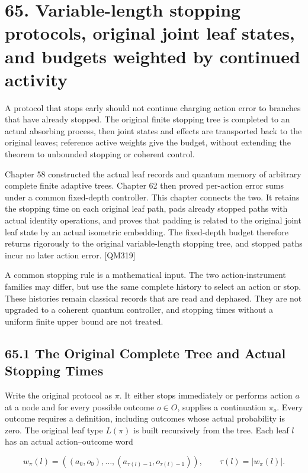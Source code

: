 \documentclass[
  11pt,
  oneside]{book}
\begin{document}
\chapter{65. Variable-length stopping protocols, original joint leaf
states, and budgets weighted by continued activity}\label{ch-65}

A protocol that stops early should not continue charging action error to
branches that have already stopped. The original finite stopping tree is
completed to an actual absorbing process, then joint states and effects
are transported back to the original leaves; reference active weights
give the budget, without extending the theorem to unbounded stopping or
coherent control.

Chapter 58 constructed the actual leaf records and quantum memory of
arbitrary complete finite adaptive trees. Chapter 62 then proved
per-action error sums under a common fixed-depth controller. This
chapter connects the two. It retains the stopping time on each original
leaf path, pads already stopped paths with actual identity operations,
and proves that padding is related to the original joint leaf state by
an actual isometric embedding. The fixed-depth budget therefore returns
rigorously to the original variable-length stopping tree, and stopped
paths incur no later action error. {[}QM319{]}

A common stopping rule is a mathematical input. The two
action-instrument families may differ, but use the same complete history
to select an action or stop. These histories remain classical records
that are read and dephased. They are not upgraded to a coherent quantum
controller, and stopping times without a uniform finite upper bound are
not treated.

\section{65.1 The Original Complete Tree and Actual Stopping Times}

Write the original protocol as \(\pi\). It either stops immediately or
performs action \(a\) at a node and for every possible outcome
\(o\in O\), supplies a continuation \(\pi_o\). Every outcome requires a
definition, including outcomes whose actual probability is zero. The
original leaf type \(L(\pi)\) is built recursively from the tree. Each
leaf \(l\) has an actual action--outcome word

\[
w_\pi(l)=((a_0,o_0),\ldots,(a_{\tau(l)-1},o_{\tau(l)-1})),
\qquad \tau(l)=|w_\pi(l)|.
\]
\end{document}

